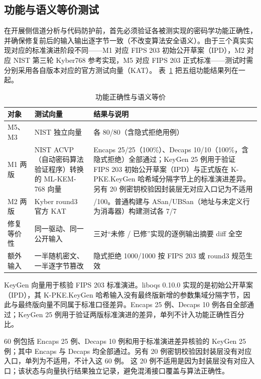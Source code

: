 \subsection{功能与语义等价测试}

在开展侧信道分析与代码防护前，首先必须验证各被测实现的密码学功能正确性，并确保修复前后的输入输出逐字节一致（不改变算法安全语义）。由于三个真实实现对应的标准演进阶段不同——M1 对应 FIPS 203 初始公开草案（IPD），M2 对应 NIST 第三轮 Kyber768 参考实现，M5 对应 FIPS 203 正式标准——测试时需分别采用各自版本对应的官方测试向量（KAT）。\cite{fips203}
表~\ref{tab:function} 把五组功能结果列在一起。%

\begin{table}[H]
\centering
\caption{功能正确性与语义等价}
\label{tab:function}
{\small
\begin{tabularx}{\textwidth}{|>{\raggedright\arraybackslash}p{2.5cm}|>{\raggedright\arraybackslash}p{3.5cm}|>{\raggedright\arraybackslash}X|}
\hline
对象 & 测试向量 & 结果与说明 \\
\hline
M5、M3 & NIST 独立向量 & 各 80/80（含隐式拒绝用例） \\
\hline
M1 两版 & NIST ACVP（自动密码算法验证程序）转换的 ML-KEM-768 向量 & Encaps 25/25（100\%）、Decaps 10/10（100\%，含隐式拒绝）全部通过；KeyGen 25 例用于验证 FIPS 203 初始公开草案（IPD）与正式版在 K-PKE.KeyGen 哈希域分隔字节上的标准演进差异。另有 20 例密钥校验因封装层无对应入口记为不适用 \\
\hline
M2 两版 & Kyber round3 官方 KAT & 100/100。普通构建与 ASan/UBSan（地址与未定义行为消毒器）构建测试各 7/7 \\
\hline
修复等价性 & 同一驱动、同一公开输入 & 三对“未修 / 已修”实现的逐例输出摘要 diff 全空 \\
\hline
额外输入 & 一半随机密文、一半逐字节篡改 & 隐式拒绝 1000/1000 按 FIPS 203 或 round3 规范生效 \\
\hline
\end{tabularx}
}
\end{table}

KeyGen 向量用于核验 FIPS 203 标准演进。liboqs 0.10.0 实现的是初始公开草案（IPD），其 K-PKE.KeyGen 哈希输入没有最终版新增的参数集域分隔字节，因此与最终版向量不同属于标准口径差异。Encaps 25 例、Decaps 10 例各自全部通过；KeyGen 25 例用于验证两版标准演进的差异，单列不计入功能正确性百分比。

60 例包括 Encaps 25 例、Decaps 10 例和用于标准演进差异核验的 KeyGen 25 例；其中 Encaps 与 Decaps 均全部通过。另有 20 例密钥校验因封装层没有对应入口，单列为不适用，不计入这 60 例。
这 20 例不适用是因为封装层没有对应入口；该状态与向量执行结果独立记录，避免混淆接口覆盖与算法正确性。

